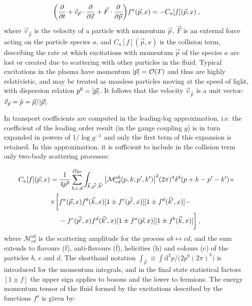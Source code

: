 \begin{equation}
\biggl( \frac{\partial  }{\partial t}+ \vec v_{\vec p} \cdot \frac{\partial  }{\partial \vec x} + \vec F \cdot \frac{\partial  }{\partial \vec p} \biggr) f^a(\vec p,x) = -C_a[f] (\vec p,x) \: ,
\end{equation}
%
where $\vec v_{\vec p}$ is the velocity of a particle with momentum $\vec p$, $\vec F$ is an external force acting on the particle species $a$, and $C_a[f](\vec p, x)$ is the collision term, describing the rate at which excitations with momentum $\vec p$ of the species $a$ are lost or created due to scattering with other particles in the fluid. Typical excitations in the plasma have momentum $\abs{\vec p} = \mathcal O(T)$ and thus are highly relativistic, and may be treated as massless particles moving at the speed of light, with dispersion relation $p^0= \abs{\vec p}$. It follows that the velocity $\vec v_{\vec p}$ is a unit vector: $\vec v_{\vec p} = \hat p = \vec p/ \abs{\vec p}$. 

In \cite{Arnold:2000dr} transport coefficients are computed in the leading-log approximation, i.e. the coefficient of the leading order result (in the gauge coupling $g$) is in turn expanded in powers of $1/\log{g^{-1}}$ and only the first term of this expansion is retained. In this approximation, it is sufficient to include in the collision term only two-body scattering processes:

\begin{equation}
\begin{split}
C_a[f](\vec p, x)  & = \frac{1}{4 p^0} \sum_{b,c,d}^{\mathrm{f \bar f h c}} \int_{\vec k, \vec{p'}, \vec k'} \abs{\mathcal M^{ab}_{cd}(p,k;p',k')}^2 (2 \pi)^4 \delta^4(p+k-p'-k') \times \\
& 
\begin{split}
\times  \biggl[ & f^a(\vec p,x) f^b(\vec k,x) [1 \pm f^c(\vec{p'},x)] [1 \pm f^d(\vec k',x)] - \\ 
& - f^c(\vec{p'},x) f^d(\vec k',x)[1 \pm f^a(\vec p,x)] [1 \pm f^b(\vec k,x)] \biggr]  \: ,
\end{split}
\end{split}
\end{equation}
%
where $\mathcal{M}^{ab}_{cd}$ is the scattering amplitude for the process $ab \leftrightarrow cd$, and the sum extends to flavours (f), anti-flavours ($\mathrm{\bar f}$), helicities (h) and colours (c) of the particles $b$, $c$ and $d$. The shorthand notation $\int_{\vec p} \equiv \int \mathrm{d}^3p/\bigl(2p^0 (2 \pi)^3\bigr)$ is introduced for the momentum integrals, and in the final state statistical factors $[1 \pm f]$ the upper sign applies to bosons and the lower to fermions. 
The energy momentum tensor of the fluid formed by the excitations described by the functions $f^a$ is given by:

